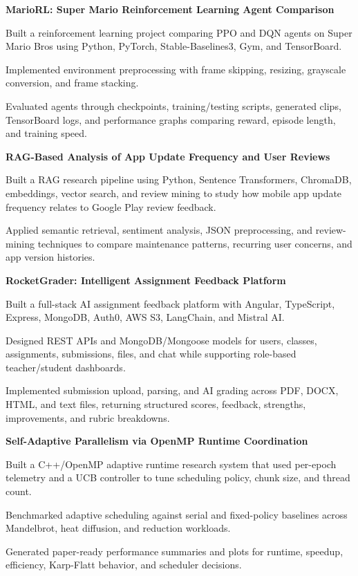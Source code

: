 \documentclass[letterpaper,10pt]{article}
\newcommand{\projectHeading}[2]{
  \vspace{2pt}
  \textbf{#1} \hfill #2
}
\begin{document}
\projectHeading{MarioRL: Super Mario Reinforcement Learning Agent Comparison}{}
\begin{tightitemize}
  \item Built a reinforcement learning project comparing PPO and DQN agents on Super Mario Bros using Python, PyTorch, Stable-Baselines3, Gym, and TensorBoard.
  \item Implemented environment preprocessing with frame skipping, resizing, grayscale conversion, and frame stacking.
  \item Evaluated agents through checkpoints, training/testing scripts, generated clips, TensorBoard logs, and performance graphs comparing reward, episode length, and training speed.
\end{tightitemize}

\projectHeading{RAG-Based Analysis of App Update Frequency and User Reviews}{}
\begin{tightitemize}
  \item Built a RAG research pipeline using Python, Sentence Transformers, ChromaDB, embeddings, vector search, and review mining to study how mobile app update frequency relates to Google Play review feedback.
  \item Applied semantic retrieval, sentiment analysis, JSON preprocessing, and review-mining techniques to compare maintenance patterns, recurring user concerns, and app version histories.
\end{tightitemize}

\projectHeading{RocketGrader: Intelligent Assignment Feedback Platform}{}
\begin{tightitemize}
  \item Built a full-stack AI assignment feedback platform with Angular, TypeScript, Express, MongoDB, Auth0, AWS S3, LangChain, and Mistral AI.
  \item Designed REST APIs and MongoDB/Mongoose models for users, classes, assignments, submissions, files, and chat while supporting role-based teacher/student dashboards.
  \item Implemented submission upload, parsing, and AI grading across PDF, DOCX, HTML, and text files, returning structured scores, feedback, strengths, improvements, and rubric breakdowns.
\end{tightitemize}

\projectHeading{Self-Adaptive Parallelism via OpenMP Runtime Coordination}{}
\begin{tightitemize}
  \item Built a C++/OpenMP adaptive runtime research system that used per-epoch telemetry and a UCB controller to tune scheduling policy, chunk size, and thread count.
  \item Benchmarked adaptive scheduling against serial and fixed-policy baselines across Mandelbrot, heat diffusion, and reduction workloads.
  \item Generated paper-ready performance summaries and plots for runtime, speedup, efficiency, Karp-Flatt behavior, and scheduler decisions.
\end{tightitemize}
\end{document}
